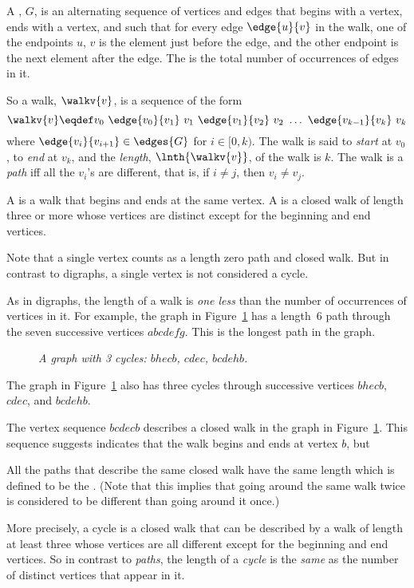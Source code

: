 \begin{definition}\label{def:simplegraph-walks}
A , $G$, is an alternating sequence of
vertices and edges that begins with a vertex, ends with a vertex, and
such that for every edge $\edge{u}{v}$ in the walk, one of the
endpoints $u$, $v$ is the element just before the edge, and the other
endpoint is the next element after the edge.  The  is the total number of occurrences of edges in it.

So a walk, $\walkv{v}$, is a sequence of the form
\[
\walkv{v} \eqdef v_0\ \edge{v_0}{v_1}\
v_1\  \edge{v_1}{v_2}\  v_2\  \dots\  \edge{v_{k-1}}{v_k}\  v_k
\]
where $\edge{v_i}{v_{i+1}} \in \edges{G}$ for $i \in [0,k)$.
  The walk is said to \emph{start} at $v_0$, to \emph{end} at $v_k$,
  and the \emph{length}, $\lnth{\walkv{v}}$, of the walk is
  $k$.  The walk is a \emph{path} iff all the $v_i$'s are different,
  that is, if $i \neq j$, then $v_i \neq v_j$.

A  is a walk that begins and ends at the same
vertex.  A  is a closed walk of length three or more whose
vertices are distinct except for the beginning and end vertices.
\end{definition}
Note that a single vertex counts as a length zero path and closed
walk.  But in contrast to digraphs, a single vertex is not considered
a cycle.

As in digraphs, the length of a walk is \emph{one less} than the
number of occurrences of vertices in it.  For example, the graph in
Figure~\ref{dg} has a length~6 path through the seven successive
vertices $abcdefg$.  This is the longest path in the graph.
\begin{figure}
\caption{\em A graph with 3 cycles: $bhecb$,
$cdec$, $bcdehb$.}
\label{dg}
\end{figure}
The graph in Figure~\ref{dg} also has three cycles through successive vertices $bhecb$,
$cdec$, and $bcdehb$.

\iffalse
The vertex sequence $bcdecb$ describes a closed walk in the graph
in Figure~\ref{dg}.  This sequence suggests indicates that the walk
begins and ends at vertex $b$, but

All the paths that describe the same closed walk have the same length
which is defined to be the \term{length of the walk}.  (Note that this
implies that going around the same walk twice is considered to be
different than going around it once.)

More precisely, a cycle is a
closed walk that can be described by a walk of length at least three whose
vertices are all different except for the beginning and end vertices.
So in contrast to \emph{paths}, the length of a \emph{cycle} is the
\emph{same} as the number of distinct vertices that appear in it.

